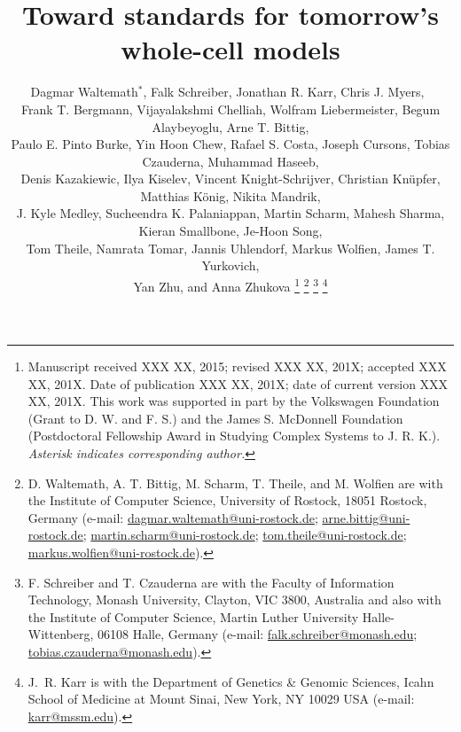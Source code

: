 \documentclass[journal,transmag]{IEEEtran}
\newcommand{\email}[1]{\href{mailto:#1}{#1}}
\begin{document}

\title{Toward standards for tomorrow's whole-cell models}

\author{
    Dagmar Waltemath$^*$,
    Falk Schreiber, 
    Jonathan R. Karr, 
    Chris J. Myers,~ \\
    Frank T. Bergmann,
    Vijayalakshmi Chelliah,
    Wolfram Liebermeister,
    Begum Alaybeyoglu,
    Arne T. Bittig, \\
    Paulo E. Pinto Burke, 
    Yin Hoon Chew,
    Rafael S. Costa,
    Joseph Cursons, 
    Tobias Czauderna,
    Muhammad Haseeb, \\
    Denis Kazakiewic, 
    Ilya Kiselev,
    Vincent Knight-Schrijver,
    Christian Kn\"{u}pfer,
    Matthias K\"{o}nig, 
    Nikita Mandrik, \\
    J. Kyle Medley,
    Sucheendra K. Palaniappan,
    Martin Scharm,
    Mahesh Sharma,
    Kieran Smallbone,
    Je-Hoon Song, \\
    Tom Theile,
    Namrata Tomar,
    Jannis Uhlendorf,
    Markus Wolfien,
    James T. Yurkovich, \\
    Yan Zhu, and
    Anna Zhukova
    \thanks{
        Manuscript received XXX XX, 2015; revised XXX XX, 201X; accepted XXX XX, 201X. Date of publication XXX XX, 201X; date of current version XXX XX, 201X.
        This work was supported in part by the Volkswagen Foundation (Grant to D. W. and F. S.) and the James S. McDonnell Foundation (Postdoctoral Fellowship Award in Studying Complex Systems to J. R. K.).
        \textit{Asterisk indicates corresponding author.}
    }
    \thanks{D. Waltemath, A. T. Bittig, M. Scharm, T. Theile, and M. Wolfien are with the Institute of Computer Science, University of Rostock, 18051 Rostock, Germany (e-mail: \email{dagmar.waltemath@uni-rostock.de}; \email{arne.bittig@uni-rostock.de}; \email{martin.scharm@uni-rostock.de}; \email{tom.theile@uni-rostock.de}; \email{markus.wolfien@uni-rostock.de}).}
    \thanks{F. Schreiber and T. Czauderna are with the Faculty of Information Technology, Monash University, Clayton, VIC 3800, Australia and also with the Institute of Computer Science, Martin Luther University Halle-Wittenberg, 06108 Halle, Germany (e-mail: \email{falk.schreiber@monash.edu}; \email{tobias.czauderna@monash.edu}).}
    \thanks{J.~R. Karr is with the Department of Genetics \& Genomic Sciences, Icahn School of Medicine at Mount Sinai, New York, NY 10029 USA (e-mail: \email{karr@mssm.edu}).}
}
\end{document}
